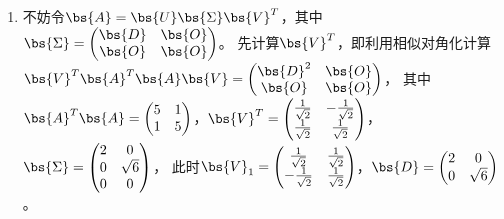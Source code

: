 \documentclass[12pt, a4paper, oneside, UTF8]{ctexbook}
\begin{document}
\begin{solution}
    \begin{enumerate}[label=(\arabic*)]
        \item 不妨令$\bs{A}=\bs{U}\bs{\Sigma}\bs{V}^T$，其中$\bs{\Sigma}=\begin{pmatrix}
            \bs{D}& \bs{O}\\
            \bs{O}&\bs{O}
        \end{pmatrix}$。
        先计算$\bs{V}^T$，即利用相似对角化计算$\bs{V}^T\bs{A}^T\bs{A}\bs{V}=\begin{pmatrix}
            \bs{D}^2&\bs{O}\\
            \bs{O}&\bs{O}
        \end{pmatrix}$，
        其中$\bs{A}^T\bs{A}=\begin{pmatrix}
            5& 1\\
            1 & 5
        \end{pmatrix}$，$\bs{V}^T=\begin{pmatrix}
            \frac{1}{\sqrt{2}}&-\frac{1}{\sqrt{2}}\\
            \frac{1}{\sqrt{2}}&\frac{1}{\sqrt{2}}
        \end{pmatrix}$，$\bs{\Sigma}=\begin{pmatrix}
            2 & 0\\
            0 & \sqrt{6} \\
            0 & 0
        \end{pmatrix}$，
        此时$\bs{V}_1=\begin{pmatrix}
            \frac{1}{\sqrt{2}}&\frac{1}{\sqrt{2}}\\
            -\frac{1}{\sqrt{2}}&\frac{1}{\sqrt{2}}
        \end{pmatrix}
        $，$\bs{D}=\begin{pmatrix}
            2 & 0\\
            0& \sqrt{6}
        \end{pmatrix}$。


\end{enumerate}
\end{solution}
\end{document}
